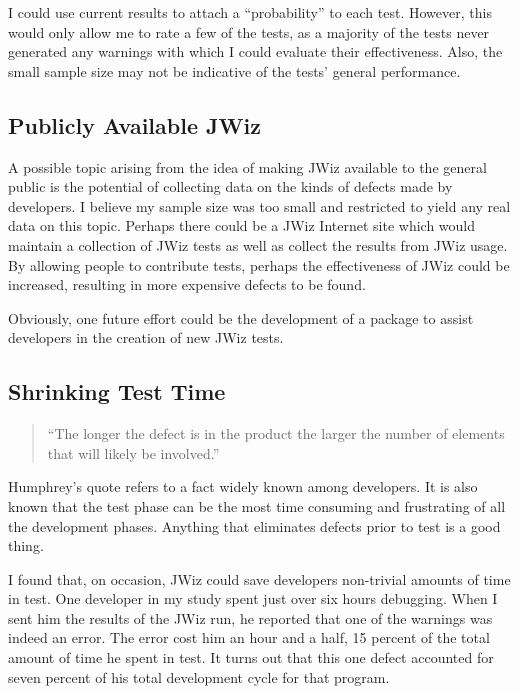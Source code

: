 I could use current results to attach a ``probability'' to each test.
However, this would only allow me to rate a few of the tests, as a majority 
of the tests never generated any warnings with which I could evaluate their 
effectiveness.  Also, the small sample size may not be indicative of the
tests' general performance.

\subsection{Publicly Available JWiz}
A possible topic arising from the idea of making JWiz available to the
general public is the potential of collecting data on the kinds of defects
made by developers.  I believe my sample size was too small and restricted
to yield any real data on this topic.  Perhaps there could be a JWiz
Internet site which would maintain a collection of JWiz tests as well as
collect the results from JWiz usage.  By allowing people to contribute
tests, perhaps the effectiveness of JWiz could be increased, resulting in
more expensive defects to be found.

Obviously, one future effort could be the development of a package to assist
developers in the creation of new JWiz tests.

\subsection{Shrinking Test Time}
\begin{quotation}
  ``The longer the defect is in the product the larger the number of elements
  that will likely be involved.''\cite{Humphrey95}
\end{quotation}

Humphrey's quote refers to a fact widely known among developers.  It is
also known that the test phase can be the most time consuming and
frustrating of all the development phases.  Anything that eliminates
defects prior to test is a good thing.

I found that, on occasion, JWiz could save developers non-trivial amounts
of time in test.  One developer in my study spent just over six hours
debugging.  When I sent him the results of the JWiz run, he reported that
one of the warnings was indeed an error.  The error cost him an hour and a
half, 15 percent of the total amount of time he spent in test.  It turns
out that this one defect accounted for seven percent of his total
development cycle for that program.
  
